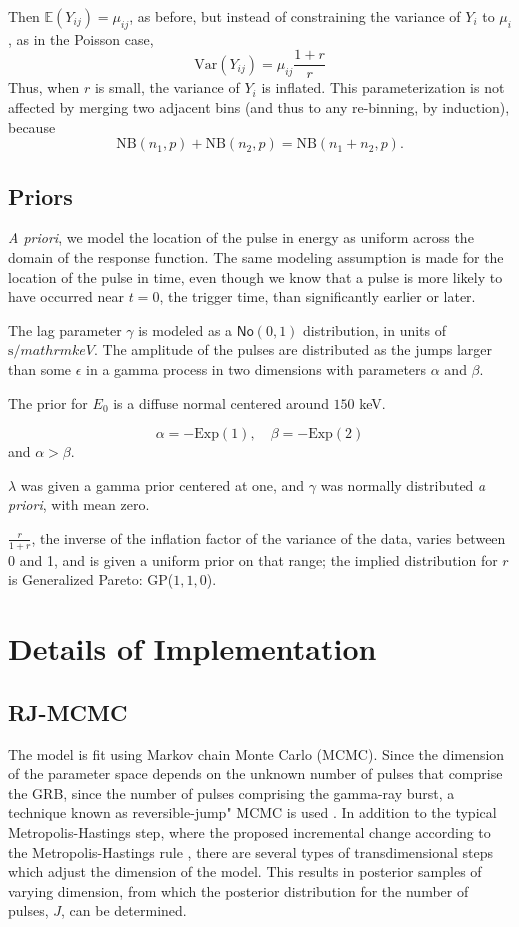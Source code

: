 \documentclass[iop,onecolumn]{emulateapj}
\newcommand{\No}{\mathsf{No}}
\begin{document}
Then $\mathbb{E}(Y_{ij}) = \mu_{ij}$, as before, but instead of constraining the variance of $Y_i$ to $\mu_i$, as in the Poisson case, 
\[ \text{Var}(Y_{ij}) = \mu_{ij} \frac{1+r}{r} \]
Thus, when $r$ is small, the variance of $Y_i$ is inflated.  This  parameterization is not affected by merging two adjacent bins (and thus to any re-binning, by induction), because \[\text{NB}(n_1, p) + \text{NB}(n_2, p)  = \text{NB}(n_1 + n_2, p). \]   
    
    \subsection{Priors}
     \emph{A priori}, we model the location of the pulse in energy as uniform across the domain of the response function. The same modeling assumption is made for the location of the pulse in time, even though we know that a pulse is more likely to have occurred near $t = 0$, the trigger time, than significantly earlier or later. 

The lag parameter $\gamma$ is modeled as a $\No(0,1)$  distribution, in units of $\mathrm{s}/mathrm{keV}$.  The amplitude of the pulses are distributed as the jumps larger than some $\epsilon$ in a gamma process in two dimensions with parameters $\alpha$ and $\beta$. 

The prior for $E_0$ is a diffuse normal centered around $150$ keV. 

$$\alpha = -  \text{Exp}(1), \quad  \beta = - \text{Exp}(2)$$ and $\alpha > \beta$.

$\lambda$ was given a gamma prior centered at one, and $\gamma$ was normally distributed \emph{a priori}, with  mean zero. 

$\frac{r}{1 + r}$, the inverse of the inflation factor of the variance of the data, varies between 0 and 1, and is given a uniform prior on that range; the implied distribution for $r$ is Generalized Pareto: GP($1,1,0$).



\section{Details of Implementation}
    \subsection{RJ-MCMC}
    The model is fit using Markov chain  Monte Carlo (MCMC).  Since the dimension of the parameter space depends on the unknown number of pulses that comprise the GRB, since the number of pulses comprising the gamma-ray burst, a technique known as reversible-jump" MCMC is used \citet{Gree:1995}.  In addition to the typical Metropolis-Hastings step, where the proposed incremental change according to the Metropolis-Hastings rule \citet{Hast:1970}, there are several types of transdimensional steps which adjust the dimension of the model.   This results in posterior samples of varying dimension, from which the posterior distribution for the number of pulses, $J$, can be determined.
\end{document}
